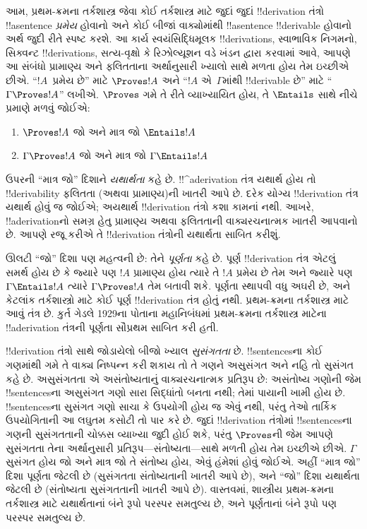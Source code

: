 \documentclass[../../../include/open-logic-section]{subfiles}
\begin{document}
આમ, પ્રથમ-ક્રમના તર્કશાસ્ત્ર જેવા કોઈ તર્કશાસ્ત્ર માટે જુદાં જુદાં
!!{derivation} તંત્રો !!a{sentence} \emph{પ્રમેય} હોવાનો અને કોઈ
બીજાં વાક્યોમાંથી !!a{sentence} !!{derivable} હોવાનો અર્થ જુદી
રીતે સ્પષ્ટ કરશે. આ કાર્ય સ્વયંસિદ્ધિમૂલક !!{derivation}s, સ્વાભાવિક
નિગમનો, સિક્વન્ટ !!{derivation}s, સત્ય-વૃક્ષો કે રિઝોલ્યૂશન વડે ખંડન
દ્વારા કરવામાં આવે, આપણે આ સંબંધો પ્રામાણ્ય અને ફલિતતાના અર્થાનુસારી
ખ્યાલો સાથે મળતા હોય તેમ ઇચ્છીએ છીએ. ``$!A$~પ્રમેય છે'' માટે
$\Proves !A$ અને ``$!A$ એ~$\Gamma$માંથી !!{derivable} છે'' માટે
``$\Gamma \Proves !A$'' લખીએ. $\Proves$ ગમે તે રીતે વ્યાખ્યાયિત હોય,
તે $\Entails$ સાથે નીચે પ્રમાણે મળવું જોઈએ:
\begin{enumerate}
\item $\Proves !A$ જો અને માત્ર જો $\Entails !A$
\item $\Gamma \Proves !A$ જો અને માત્ર જો $\Gamma \Entails !A$
\end{enumerate}
ઉપરની ``માત્ર જો'' દિશાને \emph{યથાર્થતા} કહે છે. !!^a{derivation}
તંત્ર યથાર્થ હોય તો !!{derivability} ફલિતતા (અથવા પ્રામાણ્ય)ની ખાતરી
આપે છે. દરેક યોગ્ય !!{derivation} તંત્ર યથાર્થ હોવું જ જોઈએ;
અયથાર્થ !!{derivation} તંત્રો કશા કામનાં નથી. આખરે,
!!a{derivation}નો સમગ્ર હેતુ
પ્રામાણ્ય અથવા ફલિતતાની વાક્યરચનાત્મક ખાતરી આપવાનો છે. આપણે રજૂ
કરીએ તે !!{derivation} તંત્રોની યથાર્થતા સાબિત કરીશું.

ઊલટી ``જો'' દિશા પણ મહત્વની છે: તેને \emph{પૂર્ણતા} કહે છે. પૂર્ણ
!!{derivation} તંત્ર એટલું સમર્થ હોય છે કે જ્યારે પણ $!A$ પ્રામાણ્ય
હોય ત્યારે તે $!A$ પ્રમેય છે તેમ અને જ્યારે પણ $\Gamma \Entails !A$
ત્યારે $\Gamma \Proves !A$ તેમ બતાવી શકે. પૂર્ણતા સ્થાપવી વધુ અઘરી
છે, અને કેટલાંક તર્કશાસ્ત્રો માટે કોઈ પૂર્ણ !!{derivation} તંત્ર હોતું
નથી. પ્રથમ-ક્રમના તર્કશાસ્ત્ર માટે આવું તંત્ર છે. કુર્ત ગેડલે 1929ના
પોતાના મહાનિબંધમાં પ્રથમ-ક્રમના તર્કશાસ્ત્ર માટેના !!a{derivation}
તંત્રની પૂર્ણતા સૌપ્રથમ સાબિત કરી હતી.

!!{derivation} તંત્રો સાથે જોડાયેલો બીજો ખ્યાલ \emph{સુસંગતતા} છે.
!!{sentence}sના કોઈ ગણમાંથી ગમે તે વાક્ય નિષ્પન્ન કરી શકાય તો તે
ગણને અસુસંગત અને નહિ તો સુસંગત કહે છે. અસુસંગતતા એ અસંતોષ્યતાનું
વાક્યરચનાત્મક પ્રતિરૂપ છે: અસંતોષ્ય ગણોની જેમ !!{sentence}sના
અસુસંગત ગણો સારા સિદ્ધાંતો બનતા નથી; તેમાં પાયાની ખામી હોય છે.
!!{sentence}sના સુસંગત ગણો સાચા કે ઉપયોગી હોય જ એવું નથી, પરંતુ
તેઓ તાર્કિક ઉપયોગિતાની આ લઘુતમ કસોટી તો પાર કરે છે. જુદાં
!!{derivation} તંત્રોમાં !!{sentence}sના ગણની સુસંગતતાની ચોક્કસ વ્યાખ્યા
જુદી હોઈ શકે, પરંતુ $\Proves$ની જેમ આપણે સુસંગતતા તેના અર્થાનુસારી
પ્રતિરૂપ—સંતોષ્યતા—સાથે મળતી હોય તેમ ઇચ્છીએ છીએ. $\Gamma$ સુસંગત હોય
જો અને માત્ર જો તે સંતોષ્ય હોય, એવું હંમેશાં હોવું જોઈએ. અહીં ``માત્ર
જો'' દિશા પૂર્ણતા જેટલી છે (સુસંગતતા સંતોષ્યતાની ખાતરી આપે છે), અને
``જો'' દિશા યથાર્થતા જેટલી છે (સંતોષ્યતા સુસંગતતાની ખાતરી આપે છે).
વાસ્તવમાં, શાસ્ત્રીય પ્રથમ-ક્રમના તર્કશાસ્ત્ર માટે યથાર્થતાનાં બંને
રૂપો પરસ્પર સમતુલ્ય છે, અને પૂર્ણતાનાં બંને રૂપો પણ પરસ્પર સમતુલ્ય છે.
\end{document}
